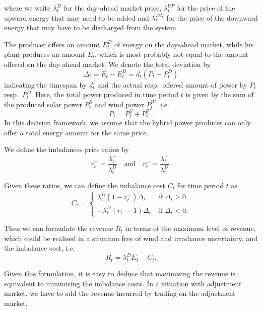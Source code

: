 where we write $\lambda_{t}^{D}$ for the day-ahead market price, $\lambda_{t}^{UP}$ for the price of the upward energy that may need to be added and $\lambda_{t}^{DN}$ for the price of the downward energy that may have to be discharged from the system.

The producer offers an amount $E_{t}^{D}$ of energy on the day-ahead market, while his plant produces an amount $E_{t}$, which is most probably not equal to the amount offered on the day-ahead market. We denote the total deviation by 
\begin{equation*}
\Delta_{t}=E_{t}-E_{t}^{D}=d_{t}\left(P_{t}-P_{t}^{D}\right)
\end{equation*}
indicating the timespan by $d_{t}$ and the actual resp.\ offered amount of power by $P_{t}$ resp.\ $P_{t}^{D}$.
Here, the total power produced in time period $t$ is given by the sum of the produced solar power $P_t^S$ and wind power $P_t^W$, i.e. 
$$ P_t = P_t^S + P_t^W.$$In this decision framework, we assume that the hybrid power producer can only offer a total energy amount for the same price. 


We define the imbalances price ratios by  
\begin{equation*}
r_{t}^{+}= \frac{\lambda_{t}^{+}}{\lambda_{t}^{D}} \quad \mathrm{and} \quad r_{t}^{-}=\frac{\lambda_{t}^{-}}{\lambda_{t}^{D}}.
\end{equation*}

Given these ratios, we can define the imbalance cost $C_t$ for time period $t$ as
\begin{equation*}
C_{t}=\begin{cases}
\lambda_{t}^D\left(1-r_{t}^{+}\right)\Delta_{t} &\mathrm{\; if \;} \Delta_{t}\ge 0
\\ -\lambda_{t}^{D}\left(r_{t}^{-}-1\right)\Delta_{t} &\mathrm{\; if \;} \Delta_{t}<0.
\end{cases}
\end{equation*}

Then we can formulate the revenue $R_t$ in terms of the maximum level of revenue, which could be realised in a situation free of wind and irradiance uncertainty, and the imbalance cost, i.e. 
\begin{equation*}
R_{t}=\lambda_{t}^{D}E_{t}-C_{t}.
\end{equation*}

Given this formulation, it is easy to deduce that maximising the revenue is equivalent to minimising the imbalance costs. In a situation with adjustment market, we have to add the revenue incurred by trading on the adjustment market.

